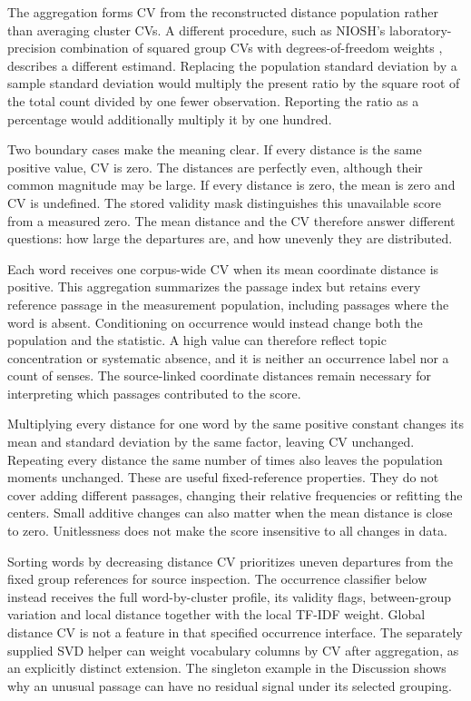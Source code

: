 \documentclass[10pt,letterpaper]{article}
\begin{document}
The aggregation forms CV from the reconstructed distance population rather than averaging cluster CVs. A different procedure, such as NIOSH's laboratory-precision combination of squared group CVs with degrees-of-freedom weights \cite{nioshcv}, describes a different estimand. Replacing the population standard deviation by a sample standard deviation would multiply the present ratio by the square root of the total count divided by one fewer observation. Reporting the ratio as a percentage would additionally multiply it by one hundred.\par

Two boundary cases make the meaning clear. If every distance is the same positive value, CV is zero. The distances are perfectly even, although their common magnitude may be large. If every distance is zero, the mean is zero and CV is undefined. The stored validity mask distinguishes this unavailable score from a measured zero. The mean distance and the CV therefore answer different questions: how large the departures are, and how unevenly they are distributed.\par

Each word receives one corpus-wide CV when its mean coordinate distance is positive. This aggregation summarizes the passage index but retains every reference passage in the measurement population, including passages where the word is absent. Conditioning on occurrence would instead change both the population and the statistic. A high value can therefore reflect topic concentration or systematic absence, and it is neither an occurrence label nor a count of senses. The source-linked coordinate distances remain necessary for interpreting which passages contributed to the score.\par

Multiplying every distance for one word by the same positive constant changes its mean and standard deviation by the same factor, leaving CV unchanged. Repeating every distance the same number of times also leaves the population moments unchanged. These are useful fixed-reference properties. They do not cover adding different passages, changing their relative frequencies or refitting the centers. Small additive changes can also matter when the mean distance is close to zero. Unitlessness does not make the score insensitive to all changes in data.\par

Sorting words by decreasing distance CV prioritizes uneven departures from the fixed group references for source inspection. The occurrence classifier below instead receives the full word-by-cluster profile, its validity flags, between-group variation and local distance together with the local TF-IDF weight. Global distance CV is not a feature in that specified occurrence interface. The separately supplied SVD helper can weight vocabulary columns by CV after aggregation, as an explicitly distinct extension. The singleton example in the Discussion shows why an unusual passage can have no residual signal under its selected grouping.\par
\end{document}
